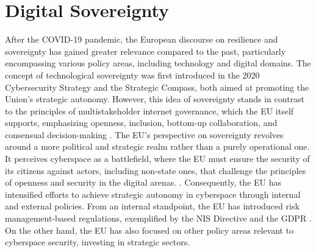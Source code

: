 \section{Digital Sovereignty}
After the COVID-19 pandemic, the European discourse on resilience and sovereignty has gained greater relevance compared to the past, particularly encompassing various policy areas, including technology and digital domains. The concept of technological sovereignty was first introduced in the 2020 Cybersecurity Strategy and the Strategic Compass, both aimed at promoting the Union's strategic autonomy. However, this idea of sovereignty stands in contrast to the principles of multistakeholder internet governance, which the EU itself supports, emphasizing openness, inclusion, bottom-up collaboration, and consensual decision-making \autocite{pohle_2020_digital}. The EU's perspective on sovereignty revolves around a more political and strategic realm rather than a purely operational one. It perceives cyberspace as a battlefield, where the EU must ensure the security of its citizens against actors, including non-state ones, that challenge the principles of openness and security in the digital arenas. \autocite{andrbarrinha_2022_speaking}. Consequently, the EU has intensified efforts to achieve strategic autonomy in cyberspace through internal and external policies. From an internal standpoint, the EU has introduced risk management-based regulations, exemplified by the NIS Directive and the GDPR \autocite{andrbarrinha_2022_speaking}. On the other hand, the EU has also focused on other policy areas relevant to cyberspace security, investing in strategic sectors.

